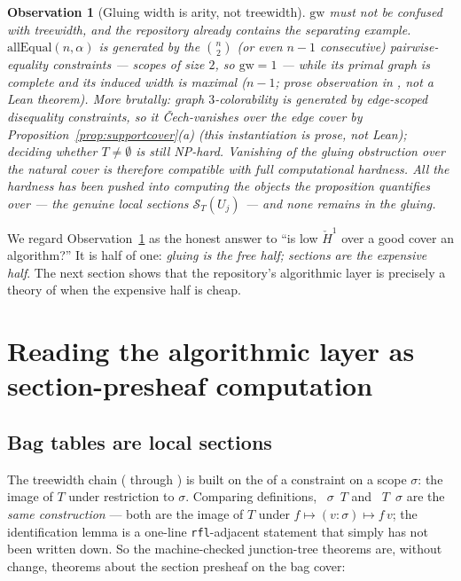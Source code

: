 \documentclass[11pt]{article}
\newtheorem{observation}{Observation}
\newcommand{\Sec}{\mathcal S}
\newcommand{\Hech}{\check H}
\begin{document}
\begin{observation}[Gluing width is arity, not treewidth]
\label{obs:arity}
$\mathrm{gw}$ must not be confused with treewidth, and the repository
already contains the separating example.
$\mathrm{allEqual}(n,\alpha)$ is generated by the $\binom n 2$ (or
even $n-1$ consecutive) pairwise-equality constraints --- scopes of
size $2$, so $\mathrm{gw} = 1$ --- while its primal graph is complete
and its induced width is maximal ($n - 1$; prose observation in
, not a Lean theorem).  More brutally:
graph $3$-colorability is generated by edge-scoped disequality
constraints, so it \v{C}ech-vanishes over the edge cover by
Proposition~\ref{prop:supportcover}(a) (this instantiation is prose,
not Lean); deciding whether $T \ne \emptyset$ is still NP-hard.  \emph{Vanishing of the gluing
obstruction over the natural cover is therefore compatible with full
computational hardness.}  All the hardness has been pushed into
computing the objects the proposition quantifies over --- the genuine
local sections $\Sec_T(U_j)$ --- and none remains in the gluing.
\end{observation}

We regard Observation~\ref{obs:arity} as the honest answer to ``is
low $\Hech^1$ over a good cover an algorithm?''  It is half of one:
\emph{gluing is the free half; sections are the expensive half}.  The
next section shows that the repository's algorithmic layer is
precisely a theory of when the expensive half is cheap.

\section{Reading the algorithmic layer as section-presheaf
computation}
\label{sec:algorithms}

\subsection{Bag tables are local sections}

The treewidth chain ( through
) is built on the  of a constraint
on a scope $\sigma$: the image of $T$ under restriction to $\sigma$.
Comparing definitions, ~$\sigma$~$T$ and
~$T$~$\sigma$ are the \emph{same construction} ---
both are the image of $T$ under $f \mapsto (v : \sigma) \mapsto f\,v$;
the identification lemma is a one-line \texttt{rfl}-adjacent statement
that simply has not been written down.  So the machine-checked
junction-tree theorems are, without change, theorems about the section
presheaf on the bag cover:
\end{document}
